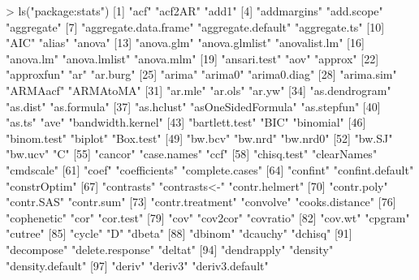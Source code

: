 \begin{Schunk}
\begin{Soutput}
> ls("package:stats")
  [1] "acf"                  "acf2AR"               "add1"                
  [4] "addmargins"           "add.scope"            "aggregate"           
  [7] "aggregate.data.frame" "aggregate.default"    "aggregate.ts"        
 [10] "AIC"                  "alias"                "anova"               
 [13] "anova.glm"            "anova.glmlist"        "anovalist.lm"        
 [16] "anova.lm"             "anova.lmlist"         "anova.mlm"           
 [19] "ansari.test"          "aov"                  "approx"              
 [22] "approxfun"            "ar"                   "ar.burg"             
 [25] "arima"                "arima0"               "arima0.diag"         
 [28] "arima.sim"            "ARMAacf"              "ARMAtoMA"            
 [31] "ar.mle"               "ar.ols"               "ar.yw"               
 [34] "as.dendrogram"        "as.dist"              "as.formula"          
 [37] "as.hclust"            "asOneSidedFormula"    "as.stepfun"          
 [40] "as.ts"                "ave"                  "bandwidth.kernel"    
 [43] "bartlett.test"        "BIC"                  "binomial"            
 [46] "binom.test"           "biplot"               "Box.test"            
 [49] "bw.bcv"               "bw.nrd"               "bw.nrd0"             
 [52] "bw.SJ"                "bw.ucv"               "C"                   
 [55] "cancor"               "case.names"           "ccf"                 
 [58] "chisq.test"           "clearNames"           "cmdscale"            
 [61] "coef"                 "coefficients"         "complete.cases"      
 [64] "confint"              "confint.default"      "constrOptim"         
 [67] "contrasts"            "contrasts<-"          "contr.helmert"       
 [70] "contr.poly"           "contr.SAS"            "contr.sum"           
 [73] "contr.treatment"      "convolve"             "cooks.distance"      
 [76] "cophenetic"           "cor"                  "cor.test"            
 [79] "cov"                  "cov2cor"              "covratio"            
 [82] "cov.wt"               "cpgram"               "cutree"              
 [85] "cycle"                "D"                    "dbeta"               
 [88] "dbinom"               "dcauchy"              "dchisq"              
 [91] "decompose"            "delete.response"      "deltat"              
 [94] "dendrapply"           "density"              "density.default"     
 [97] "deriv"                "deriv3"               "deriv3.default"      

\end{Soutput}
\end{Schunk}
